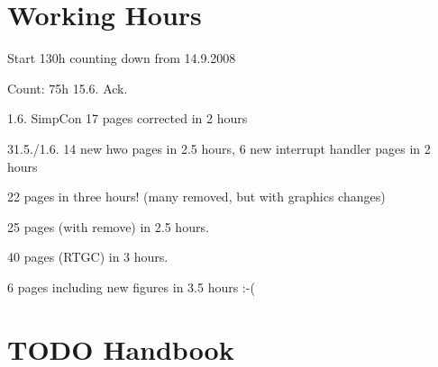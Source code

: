 \section{Working Hours}

Start 130h counting down from 14.9.2008

Count: 75h 15.6. Ack.


1.6. SimpCon 17 pages corrected in 2 hours

31.5./1.6. 14 new hwo pages in 2.5 hours, 6 new interrupt handler
pages in 2 hours

22 pages in three hours! (many removed, but with graphics changes)

25 pages (with remove) in 2.5 hours.

40 pages (RTGC) in 3 hours.

6 pages including new figures in 3.5 hours :-(

\section{TODO Handbook}

